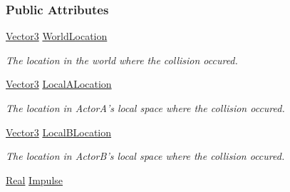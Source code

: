 \subsubsection*{Public Attributes}
\begin{DoxyCompactItemize}
\item 
\hypertarget{classphys_1_1EventCollision_a8f8a80d921bfe1ec24171c5be3ed7641}{
\hyperlink{classphys_1_1Vector3}{Vector3} \hyperlink{classphys_1_1EventCollision_a8f8a80d921bfe1ec24171c5be3ed7641}{WorldLocation}}
\label{dd/de9/classphys_1_1EventCollision_a8f8a80d921bfe1ec24171c5be3ed7641}

\begin{DoxyCompactList}\small\item\em The location in the world where the collision occured. \item\end{DoxyCompactList}\item 
\hypertarget{classphys_1_1EventCollision_a2fa146b8453d2f504abcd5055d2c2a90}{
\hyperlink{classphys_1_1Vector3}{Vector3} \hyperlink{classphys_1_1EventCollision_a2fa146b8453d2f504abcd5055d2c2a90}{LocalALocation}}
\label{dd/de9/classphys_1_1EventCollision_a2fa146b8453d2f504abcd5055d2c2a90}

\begin{DoxyCompactList}\small\item\em The location in ActorA's local space where the collision occured. \item\end{DoxyCompactList}\item 
\hypertarget{classphys_1_1EventCollision_a50d6df6b25532530cd296353ac0b55c6}{
\hyperlink{classphys_1_1Vector3}{Vector3} \hyperlink{classphys_1_1EventCollision_a50d6df6b25532530cd296353ac0b55c6}{LocalBLocation}}
\label{dd/de9/classphys_1_1EventCollision_a50d6df6b25532530cd296353ac0b55c6}

\begin{DoxyCompactList}\small\item\em The location in ActorB's local space where the collision occured. \item\end{DoxyCompactList}\item 
\hypertarget{classphys_1_1EventCollision_a577552db818f54a4092baccf597823a2}{
\hyperlink{namespacephys_af7eb897198d265b8e868f45240230d5f}{Real} \hyperlink{classphys_1_1EventCollision_a577552db818f54a4092baccf597823a2}{Impulse}}
\label{dd/de9/classphys_1_1EventCollision_a577552db818f54a4092baccf597823a2}


\end{DoxyCompactItemize}
